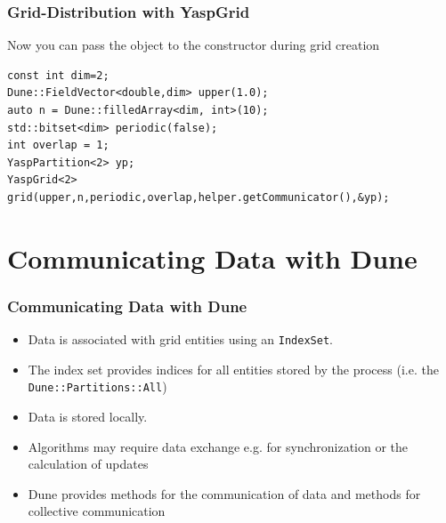 \documentclass[aspectratio=169,11pt]{beamer}
\theoremstyle{definition}
\begin{document}
\begin{frame}[fragile]
  \frametitle<presentation>{Grid-Distribution with YaspGrid}
Now you can pass the object to the constructor during grid creation
\begin{lstlisting}[breaklines=true]
const int dim=2;
Dune::FieldVector<double,dim> upper(1.0);
auto n = Dune::filledArray<dim, int>(10);
std::bitset<dim> periodic(false);
int overlap = 1;
YaspPartition<2> yp;
YaspGrid<2> grid(upper,n,periodic,overlap,helper.getCommunicator(),&yp);
\end{lstlisting}
\end{frame}

\section{Communicating Data with Dune}
\begin{frame}[fragile]
  \frametitle<presentation>{Communicating Data with Dune}


  \begin{itemize}
  \item Data is associated with grid entities using an \texttt{IndexSet}.
  \item The index set provides indices for all entities stored by the process (i.e. the \lstinline!Dune::Partitions::All!)
  \item Data is stored locally.
  \item Algorithms may require data exchange e.g. for synchronization or the calculation of updates
  \item Dune provides methods for the communication of data and methods for collective communication
  \end{itemize}

\end{frame}
\end{document}
